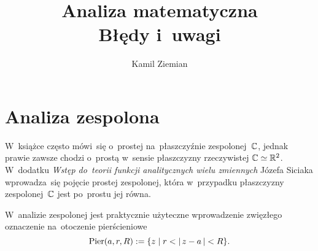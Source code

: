 \documentclass[a4paper,11pt]{article}
\title{Analiza matematyczna \\
  {\Large Błędy i~uwagi}}
\author{Kamil Ziemian}
\begin{document}





\maketitle  %





\section{Analiza zespolona}

\vspace{\spaceTwo}




\vspace{0em}



\vspace{0em}


\noindent
W~książce często mówi~się o~prostej na~płaszczyźnie zespolonej~$\mathbb{C}$,
jednak prawie zawsze chodzi o~prostą w~sensie płaszczyzny rzeczywistej
$\mathbb{C} \simeq \mathbb{R}^{ 2 }$. W~dodatku \textit{Wstęp do~teorii funkcji
  analitycznych wielu zmiennych} Józefa Siciaka wprowadza~się pojęcie
prostej zespolonej, która w~przypadku płaszczyzny zespolonej~$\mathbb{C}$ jest
po~prostu jej równa.

\vspace{\spaceFour}





\noindent
W~analizie zespolonej jest praktycznie użyteczne wprowadzenie zwięzłego
oznaczenie na~otoczenie pierścieniowe
\begin{equation}
  \label{eq:Leja-Funkcje-zespolone-01}
  \textrm{Pier}( a, r, R ) := \{ z \; | \; r < |\, {  z - a  } \,| < R \}.
\end{equation}

\vspace{\spaceFour}
\end{document}
